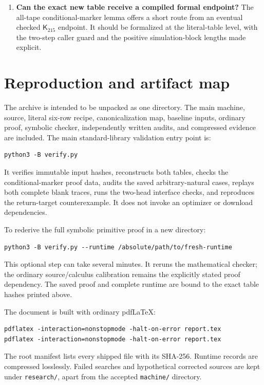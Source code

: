 \documentclass[11pt]{article}
\theoremstyle{definition}\newtheorem{definition}[theorem]{Definition}
\theoremstyle{remark}\newtheorem{remark}[theorem]{Remark}
\newcommand{\Kold}{\mathsf{K}_{215}}
\begin{document}
\begin{enumerate}
\item \textbf{Can the exact new table receive a compiled formal endpoint?}
The all-tape conditional-marker lemma offers a short route from an eventual
checked $\Kold$ endpoint. It should be formalized at the literal-table
level, with the two-step caller guard and the positive simulation-block
lengths made explicit.
\end{enumerate}

\section{Reproduction and artifact map}
\label{sec:reproduction}

The archive is intended to be unpacked as one directory. The main machine,
source, literal six-row recipe, canonicalization map, baseline inputs,
ordinary proof, symbolic checker, independently written audits, and
compressed evidence are included. The main standard-library validation
entry point is:
\begin{lstlisting}
python3 -B verify.py
\end{lstlisting}
It verifies immutable input hashes, reconstructs both tables, checks the
conditional-marker proof data, audits the saved arbitrary-natural cases,
replays both complete blank traces, runs the two-head interface checks,
and reproduces the return-target counterexample. It does not invoke an
optimizer or download dependencies.

To rederive the full symbolic primitive proof in a new directory:
\begin{lstlisting}
python3 -B verify.py --runtime /absolute/path/to/fresh-runtime
\end{lstlisting}
This optional step can take several minutes. It reruns the mathematical
checker; the ordinary source/calculus calibration remains the explicitly
stated proof dependency. The saved proof and complete runtime are bound
to the exact table hashes printed above.

The document is built with ordinary pdfLaTeX:
\begin{lstlisting}
pdflatex -interaction=nonstopmode -halt-on-error report.tex
pdflatex -interaction=nonstopmode -halt-on-error report.tex
\end{lstlisting}
The root manifest lists every shipped file with its SHA-256. Runtime
records are compressed losslessly. Failed searches and hypothetical
corrected sources are kept under \texttt{research/}, apart from the
accepted \texttt{machine/} directory.
\end{document}
